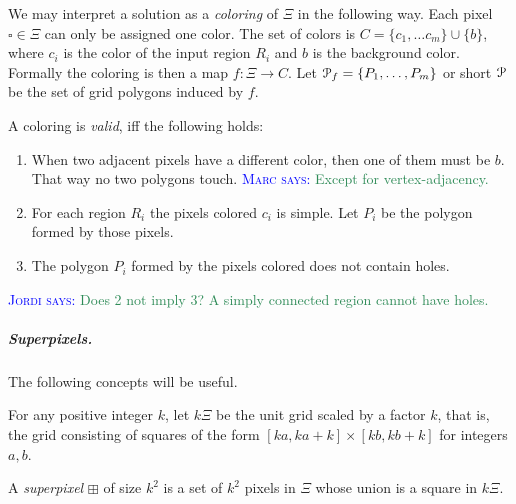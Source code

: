 \documentclass[a4paper,UKenglish,cleveref]{lipics-v2019}
\newcommand{\mremark}[3]{\textcolor{blue}{\textsc{#1 #2:}} \textcolor{SeaGreen}{\textsf{#3}}}
\newcommand{\marc}[2][says]{\mremark{Marc}{#1}{#2}}
\newcommand{\jerome}[2][says]{\mremark{J\'er\^ome}{#1}{#2}}
\newcommand{\jordi}[2][says]{\mremark{Jordi}{#1}{#2}}
\newcommand{\pix}{\square}
\newcommand{\spix}{\boxplus}
\begin{document}
We may interpret a solution as a {\em coloring} of $\Xi$ in the following way.
Each pixel $\pix\in\Xi$ can only be assigned one color. The set of colors is $C = \{c_1,\dots c_m\}\cup\{b\}$, where $c_i$ is the color of the input region $R_i$ and $b$ is the background color.
Formally the coloring is then a map $f:\Xi\to C$.
Let ${\cal P}_f=\{P_1,\dots, P_m\}$ or short ${\cal P}$ be the set of grid polygons induced by $f$.

\begin{definition}
A coloring is \emph{valid}, iff the following holds:
\begin{enumerate}
	\item When two adjacent pixels have a different color, then one of them must be $b$. That way no two polygons touch. \marc{Except for vertex-adjacency.}
	\item For each region $R_i$ the pixels colored $c_i$ is simple. Let $P_i$ be the polygon formed by those pixels.
	\item The polygon $P_i$ formed by the pixels colored does not contain holes.
\end{enumerate}

\jordi{Does 2 not imply 3? A simply connected region cannot have holes.}

\end{definition}


\subparagraph {Superpixels.}

The following concepts will be useful.

For any positive integer $k$, let $k\Xi$ be the unit grid scaled by a factor $k$, that is, the grid consisting of squares of the form $[ka, ka+k] \times [kb, kb+k]$ for integers $a, b$.

\begin{definition}
A \emph{superpixel} $\spix$ of size $k^2$ is a set of $k^2$ pixels in $\Xi$ whose union is a square in $k\Xi$. %
\end{definition}
\end{document}
